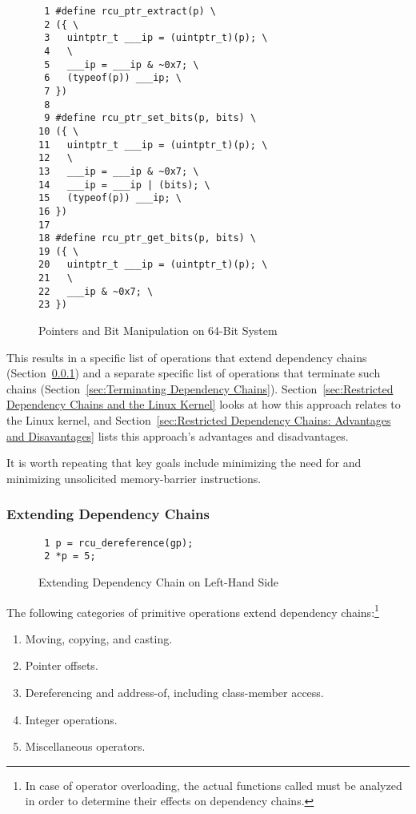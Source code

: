 \documentclass[letterpaper,twocolumn,10pt]{article}
\begin{document}
\begin{figure}[tbp]
{ \scriptsize
\begin{verbatim}
 1 #define rcu_ptr_extract(p) \
 2 ({ \
 3   uintptr_t ___ip = (uintptr_t)(p); \
 4   \
 5   ___ip = ___ip & ~0x7; \
 6   (typeof(p)) ___ip; \
 7 })
 8 
 9 #define rcu_ptr_set_bits(p, bits) \
10 ({ \
11   uintptr_t ___ip = (uintptr_t)(p); \
12   \
13   ___ip = ___ip & ~0x7; \
14   ___ip = ___ip | (bits); \
15   (typeof(p)) ___ip; \
16 })
17 
18 #define rcu_ptr_get_bits(p, bits) \
19 ({ \
20   uintptr_t ___ip = (uintptr_t)(p); \
21   \
22   ___ip & ~0x7; \
23 })
\end{verbatim}
}
\caption{Pointers and Bit Manipulation on 64-Bit System}
\label{fig:Pointers and Bit Manipulation on 64-Bit System}
\end{figure}

This results in a specific list of operations that extend dependency chains
(Section~\ref{sec:Extending Dependency Chains})
and a separate specific list of operations that terminate such chains
(Section~\ref{sec:Terminating Dependency Chains}).
Section~\ref{sec:Restricted Dependency Chains and the Linux Kernel}
looks at how this approach relates to the Linux kernel, and
Section~\ref{sec:Restricted Dependency Chains: Advantages and Disavantages}
lists this approach's advantages and disadvantages.

It is worth repeating that key goals include minimizing the need
for  and minimizing unsolicited
memory-barrier instructions.

\subsubsection{Extending Dependency Chains}
\label{sec:Extending Dependency Chains}

\begin{figure}[tbp]
{ \scriptsize
\begin{verbatim}
 1 p = rcu_dereference(gp);
 2 *p = 5;
\end{verbatim}
}
\caption{Extending Dependency Chain on Left-Hand Side}
\label{fig:Extending Dependency Chain on Left-Hand Side}
\end{figure}

The following categories of primitive operations extend dependency
chains:\footnote{
	In case of operator overloading, the actual functions called must
	be analyzed in order to determine their effects on dependency
	chains.}

\begin{enumerate}
\item	Moving, copying, and casting.
\item	Pointer offsets.
\item	Dereferencing and address-of, including class-member access.
\item	Integer operations.
\item	Miscellaneous operators.
\end{enumerate}
\end{document}
